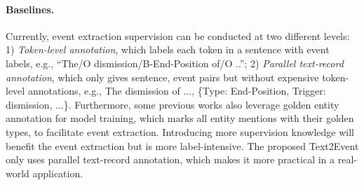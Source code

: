 \documentclass[11pt,a4paper]{article}
\begin{document}
\begin{table}[!t]
    \centering
    \setlength{\belowcaptionskip}{-0.5cm}
    \caption{Dataset statistics.}
    \label{tab:dataset}
\end{table}%
\paragraph{Baselines.}

Currently, event extraction supervision can be conducted at two different levels:
1) \textit{Token-level annotation}, which labels each token in a sentence with event labels, e.g., ``The/O dismission/B-End-Position of/O ..'';
2) \textit{Parallel text-record annotation}, which only gives sentence, event pairs but without expensive token-level annotations, e.g., The dismission of ..., \{Type: End-Position, Trigger: dismission, ...\}.
Furthermore, some previous works also leverage golden entity annotation for model training, which marks all entity mentions with their golden types, to facilitate event extraction.
Introducing more supervision knowledge will benefit the event extraction but is more label-intensive.
The proposed Text2Event only uses parallel text-record annotation, which makes it more practical in a real-world application.
\end{document}
